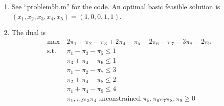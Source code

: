 \documentclass[12pt]{article}
\begin{document}
\begin{enumerate}
\begin{enumerate}
\begin{proof}
          This is a $10\times9$ matrix, so there are 10 $9\times9$ submatrices
          that we need to test, each obtained by removing a column from the
          above matrix.\\
          Note that the top four rows are linearly dependent, by taking the sum
          of the first three rows and subtracting the fourth. Also note that
          this holds when any single column is removed. Therefore, all of these
          submatrices have a 0 determinant, so $M$ is unimodular, and so by
          Cramer`s rule, $Mx=b$, with $b$ integer, is satisfiable by an integer
          $x$. Since $b$ for this linear program is integer, any basic feasible
          solution is integer.\\
        \end{proof}
      \item
        See ``problem5b.m'' for the code. An optimal basic feasible solution
        is $(x_1,x_2,x_3,x_4,x_5)=(1,0,0,1,1)$.
      \item
        The dual is
        \begin{equation}
          \begin{split}
            \text{max}\ &2\pi_1+\pi_2-\pi_3+2\pi_4-\pi_5-2\pi_6-\pi_7-3\pi_8-2\pi_9\\
            \text{s.t.}\ &\pi_1-\pi_3-\pi_5\leq1\\
            &\pi_3+\pi_4-\pi_6\leq1\\
            &\pi_1-\pi_2-\pi_7\leq3\\
            &\pi_2+\pi_4-\pi_8\leq2\\
            &\pi_1+\pi_4-\pi_9\leq4\\
            &\pi_1,\pi_2\pi_3\pi_4\ \text{unconstrained},\pi_5,\pi_6\pi_7\pi_8,\pi_9\geq0\\
          \end{split}
        \end{equation}


\end{enumerate}
\end{enumerate}
\end{document}

